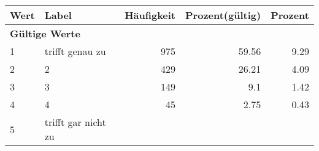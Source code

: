      \begin{longtable}{lXrrr}
     \toprule
     \textbf{Wert} & \textbf{Label} & \textbf{Häufigkeit} & \textbf{Prozent(gültig)} & \textbf{Prozent} \\
     \endhead
     \midrule
     \multicolumn{5}{l}{\textbf{Gültige Werte}}\\

     1 &
     \multicolumn{1}{X}{ trifft genau zu   } &


       \num{975} &
       \num[round-mode=places,round-precision=2]{59.56} &
         \num[round-mode=places,round-precision=2]{9.29} \\

     2 &
     \multicolumn{1}{X}{ 2   } &


       \num{429} &
       \num[round-mode=places,round-precision=2]{26.21} &
         \num[round-mode=places,round-precision=2]{4.09} \\

     3 &
     \multicolumn{1}{X}{ 3   } &


       \num{149} &
       \num[round-mode=places,round-precision=2]{9.1} &
         \num[round-mode=places,round-precision=2]{1.42} \\

     4 &
     \multicolumn{1}{X}{ 4   } &


       \num{45} &
       \num[round-mode=places,round-precision=2]{2.75} &
         \num[round-mode=places,round-precision=2]{0.43} \\

     5 &
     \multicolumn{1}{X}{ trifft gar nicht zu   } &



\end{longtable}
